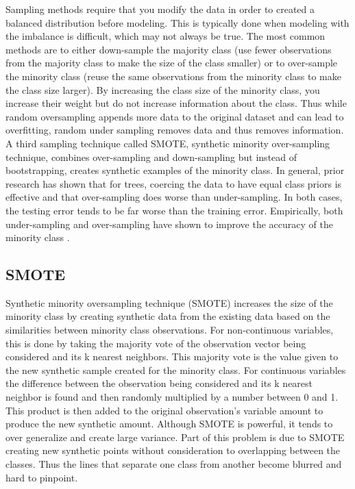 \documentclass[a4paper]{article}
\begin{document}
	Sampling methods require that you modify the data in order to created a balanced distribution before modeling. This is typically done when modeling with the imbalance is difficult, which may not always be true. The most common methods are to either down-sample the majority class (use fewer observations from the majority class to make the size of the class smaller) or to over-sample the minority class (reuse the same observations from the minority class to make the class size larger). By increasing the class size of the minority class, you increase their weight but do not increase information about the class. Thus while random oversampling appends more data to the original dataset and can lead to overfitting, random under sampling removes data and thus removes information. A third sampling technique called SMOTE, synthetic minority over-sampling technique, combines over-sampling and down-sampling but instead of bootstrapping, creates synthetic examples of the minority class. In general, prior research has shown that for trees, coercing the data to have equal class priors is effective and that over-sampling does worse than under-sampling. In both cases, the testing error tends to be far worse than the training error.%
    Empirically, both under-sampling and over-sampling have shown to improve the accuracy of the minority class .%
 
\subsection{SMOTE}
Synthetic minority oversampling technique (SMOTE) increases the size of the minority class by creating synthetic data from the existing data based on the similarities between minority class observations. For non-continuous variables, this is done by taking the majority vote of the observation vector being considered and its k nearest neighbors. This majority vote is the value given to the new synthetic sample created for the minority class. For continuous variables the difference between the observation being considered and its k nearest neighbor is found and then randomly multiplied by a number between 0 and 1. This product is then added to the original observation's variable amount to produce the new synthetic amount. Although SMOTE is powerful, it tends to over generalize and create large variance. Part of this problem is due to SMOTE creating new synthetic points without consideration to overlapping between the classes. Thus the lines that separate one class from another become blurred and hard to pinpoint.%
\end{document}
